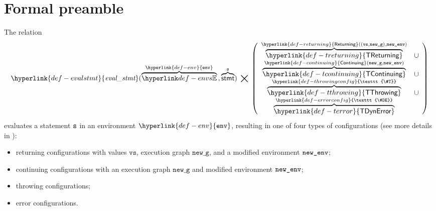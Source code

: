 \documentclass{book}
\newcommand\ThrowingConfig[0]{\hyperlink{def-throwingconfig}{\texttt{\#T}}}
\newcommand\ErrorConfig[0]{\hyperlink{def-errorconfig}{\texttt{\#DE}}}
\newcommand\TError[0]{\hyperlink{def-terror}{\textsf{TDynError}}}
\newcommand\TThrowing[0]{\hyperlink{def-tthrowing}{\textsf{TThrowing}}}
\newcommand\TContinuing[0]{\hyperlink{def-tcontinuing}{\textsf{TContinuing}}}
\newcommand\TReturning[0]{\hyperlink{def-treturning}{\textsf{TReturning}}}
\newcommand\evalstmt[1]{\hyperlink{def-evalstmt}{\textfunc{eval\_stmt}}(#1)}
\newcommand\Continuing[0]{\hyperlink{def-continuing}{\textsf{Continuing}}}
\newcommand\Returning[0]{\hyperlink{def-returning}{\textsf{Returning}}}
\newcommand\env[0]{\hyperlink{def-env}{\texttt{env}}}
\newcommand\newg[0]{\texttt{new\_g}}
\newcommand\vvs[0]{\texttt{vs}}
\begin{document}
\section{Formal preamble}

The relation
\hypertarget{def-evalstmt}{}
\[
  \evalstmt{\overname{\envs}{\env} \aslsep \overname{\stmt}{\vs}} \;\aslrel\;
  \left(
  \begin{array}{cl}
  \overname{\TReturning}{\Returning((\vvs,\newg), \newenv)} & \cup\\
  \overname{\TContinuing}{\Continuing(\newg,\newenv)} & \cup\\
  \overname{\TThrowing}{\ThrowingConfig} & \cup \\
  \overname{\TError}{\ErrorConfig} &
  \end{array}
  \right)
\]
evaluates a statement $\texttt{s}$ in an environment $\env$, resulting in one of four types of configurations
(see more details in ):
\begin{itemize}
  \item returning configurations with values $\vvs$, execution graph $\newg$, and a modified environment $\texttt{new\_env}$;
  \item continuing configurations with an execution graph $\newg$ and modified environment $\texttt{new\_env}$;
  \item throwing configurations;
  \item error configurations.
\end{itemize}
\end{document}
